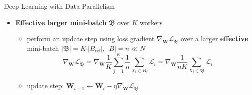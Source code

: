 \begin{frame}{Deep Learning with Data Parallelism}
\protect\hypertarget{deep-learning-with-data-parallelism-4}{}

\begin{itemize}
\tightlist
\item
  \textbf{Effective larger mini-batch} \(\mathfrak{B}\) over \(K\)
  workers

  \begin{itemize}
  \tightlist
  \item
    perform an update step using loss gradient
    \(\nabla_\mathbf{W} \mathcal{L}_{\mathfrak{B}}\) over a larger
    \textbf{effective} mini-batch
    \(\vert \mathfrak{B} \vert = K \cdot \vert B_{\text{ref}}\vert,\ \vert B \vert = n \ll N\)
    \[ \nabla_\mathbf{W} \mathcal{L}_{\mathfrak{B}} = \nabla_\mathbf{W} \dfrac{1}{K} {\displaystyle \sum_{j = 1}^{K} } \dfrac{1}{n} {\displaystyle \sum_{X_i \in B_j} \mathcal{L}_i} = \nabla_\mathbf{W} \dfrac{1}{nK} {\displaystyle \sum_{X_i \in \mathfrak{B}} \mathcal{L}_i} \]
  \item
    update step:
    \(\mathbf{W}_{t+1} \leftarrow \mathbf{W}_t - \eta \nabla_\mathbf{W} \mathcal{L}_{\mathfrak{B}}\)
  \end{itemize}
\end{itemize}


\end{frame}

